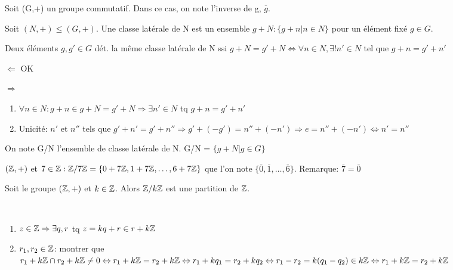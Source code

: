 Soit (G,+) un groupe commutatif. Dans ce cas, on note l'inverse de g, $\overline{g}$.

\begin{defn}
Soit $(N,+) \leq (G,+)$. Une classe latérale de N est un ensemble $g + N : \{ g+n | n \in N \}$ pour un élément fixé $g \in G$.
\end{defn}

\begin{prop}
Deux éléments $g, {g}' \in G$ dét. la même classe latérale de N ssi $g+N = {g}' + N \Leftrightarrow \forall n \in N, \exists! {n}' \in N$ tel que $g+n={g}' + {n}'$
\end{prop}

\begin{demo}
$\Leftarrow$ OK

\hspace{-0.55cm}$\Rightarrow$
	\begin{enumerate}[$\cdot$]
		\item $\forall n \in N: g+n \in g + N = {g}' + N \Rightarrow \exists {n}' \in N$ tq $g+n = {g}' + {n}'$
		\item Unicité: ${n}'$ et ${n}''$ tels que ${g}' + {n}' = {g}' + {n}'' \Rightarrow {g}' + (-{g}') = {n}'' + (-{n}') \Rightarrow e={n}'' + (-{n}') \Leftrightarrow {n}' = {n}''$
	\end{enumerate}
\end{demo}

\begin{defn}
On note G/N l'ensemble de classe latérale de N. G/N = $\{ g + N | g \in G \}$
\end{defn}

\begin{exmp}
$(\mathbb{Z},+)$ et $7 \in \mathbb{Z}: \mathbb{Z}/7\mathbb{Z} = \{ 0+7\mathbb{Z}, 1+7\mathbb{Z}, \ldots, 6+7\mathbb{Z} \}$ que l'on note $\{ \overline{0}, \overline{1},\ldots, \overline{6}\}$. Remarque: $\overline{7} = \overline{0}$
\end{exmp}

\newpage

\begin{prop}
Soit le groupe $(\mathbb{Z},+)$ et $k \in \mathbb{Z}$. Alors $\mathbb{Z}/k\mathbb{Z}$ est une partition de $\mathbb{Z}$.
\end{prop}

\begin{demo} $\;$
\begin{enumerate}[$\cdot$]
	\item $z \in \mathbb{Z} \Rightarrow \exists q,r$ tq $z = kq + r \in r+k\mathbb{Z}$
	\item $r_1,r_2 \in \mathbb{Z}$: montrer que $r_1 + k\mathbb{Z} \cap r_2 + k\mathbb{Z} \neq 0 \Leftrightarrow r_1 + k\mathbb{Z} = r_2 + k\mathbb{Z} \Leftrightarrow r_1 + k q_1 = r_2 + k q_2 \Leftrightarrow r_1 - r_2 = k(q_1-q_2) \in k\mathbb{Z} \Leftrightarrow r_1 + k\mathbb{Z} = r_2 + k\mathbb{Z}$  
\end{enumerate}
\end{demo}

